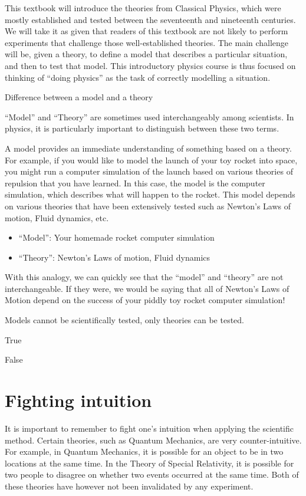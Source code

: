 This textbook will introduce the theories from Classical Physics, which were mostly established and tested between the seventeenth and nineteenth centuries. We will take it as given that readers of this textbook are not likely to perform experiments that challenge those well-established theories. The main challenge will be, given a theory, to define a model that describes a particular situation, and then to test that model. This introductory physics course is thus focused on thinking of ``doing physics'' as the task of correctly modelling a situation.

\begin{studentopinion}{Difference between a model and a theory}

``Model'' and ``Theory'' are sometimes used interchangeably among scientists. In physics, it is particularly important to distinguish between these two terms.

A model provides an immediate understanding of something based on a theory. For example, if you would like to model the launch of your toy rocket into space, you might run a computer simulation of the launch based on various theories of repulsion that you have learned. In this case, the model is the computer simulation, which describes what will happen to the rocket. This model depends on various theories that have been extensively tested such as Newton's Laws of motion, Fluid dynamics, etc. 
\begin{itemize}
\item``Model'': Your homemade rocket computer simulation
\item``Theory'': Newton's Laws of motion, Fluid dynamics
\end{itemize}

With this analogy, we can quickly see that the ``model'' and ``theory'' are not interchangeable. If they were, we would be saying that all of Newton's Laws of Motion depend on the success of your piddly toy rocket computer simulation!
\end{studentopinion}

\begin{checkpointMC}{Models cannot be scientifically tested, only theories can be tested.}
\item True
\item False
\end{checkpointMC}

\section{Fighting intuition}
It is important to remember to fight one's intuition when applying the scientific method. Certain theories, such as Quantum Mechanics, are very counter-intuitive. For example, in Quantum Mechanics, it is possible for an object to be in two locations at the same time. In the Theory of Special Relativity, it is possible for two people to disagree on whether two events occurred at the same time. Both of these theories have however not been invalidated by any experiment.

